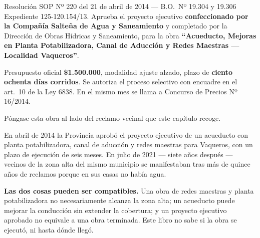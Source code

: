 \begin{ficha}{Resolución SOP Nº 220 del 21 de abril de 2014 --- B.O.\ Nº 19.304 y 19.306}
Expediente 125-120.154/13. Aprueba el proyecto ejecutivo \textbf{confeccionado por la Compañía Salteña de Agua y Saneamiento} y completado por la Dirección de Obras Hídricas y Saneamiento, para la obra \textbf{``Acueducto, Mejoras en Planta Potabilizadora, Canal de Aducción y Redes Maestras --- Localidad Vaqueros''}.

Presupuesto oficial \textbf{\$1.500.000}, modalidad ajuste alzado, plazo de \textbf{ciento ochenta días corridos}. Se autoriza el proceso selectivo con encuadre en el art.\ 10 de la Ley 6838. En el mismo mes se llama a Concurso de Precios Nº 16/2014.
\end{ficha}

\begin{cautela}
Póngase esta obra al lado del reclamo vecinal que este capítulo recoge.

En abril de 2014 la Provincia aprobó el proyecto ejecutivo de un acueducto con planta potabilizadora, canal de aducción y redes maestras para Vaqueros, con un plazo de ejecución de seis meses. En julio de 2021 --- siete años después --- vecinos de la zona alta del mismo municipio se manifestaban tras más de quince años de reclamos porque en sus casas no había agua.

\textbf{Las dos cosas pueden ser compatibles.} Una obra de redes maestras y planta potabilizadora no necesariamente alcanza la zona alta; un acueducto puede mejorar la conducción sin extender la cobertura; y un proyecto ejecutivo aprobado no equivale a una obra terminada. Este libro no sabe si la obra se ejecutó, ni hasta dónde llegó.


\end{cautela}
